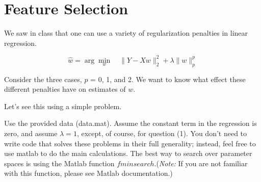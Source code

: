 \section{Feature Selection}
We saw in class that one can use a variety of regularization penalties in linear regression.

$$\hat{w} = \arg \min_w  \quad \|Y - Xw\|_2^2 + \lambda \|w\|_p^p$$

Consider the three cases, $p$ = 0, 1, and 2. We want to know what
effect these different penalties have on estimates of $w$.

Let's see this using a simple problem. 

Use the provided data (data.mat).  Assume the
constant term in the regression is zero, and assume $\lambda=1$,
except, of course, for question (1).  You don't need to write code
that solves these problems in their full generality; instead, feel
free to use matlab to do the main calculations.
The best way to search over parameter spaces is using the  Matlab function $fminsearch$.(\emph{Note:} If you are not familiar with this function, please see Matlab documentation.)\\

